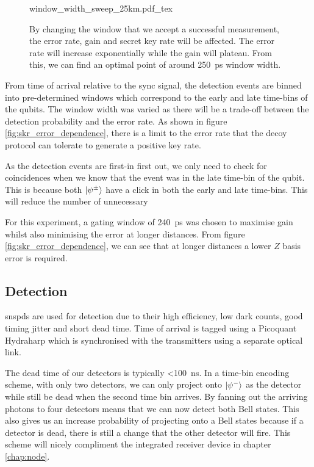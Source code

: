 \begin{figure}[tbp]
	\centering
	\tiny
	\def\svgwidth{\textwidth} 
	{window_width_sweep_25km.pdf_tex}
	\caption[Qubit window width sweep]{By changing the window that we accept a successful measurement, the error rate, gain and secret key rate will be affected. The error rate will increase exponentially while the gain will plateau. From this, we can find an optimal point of around \SI{250}{\ps} window width.}
	\label{fig:window_sweep}
\end{figure}

From time of arrival relative to the sync signal, the detection events are binned into pre-determined windows which correspond to the early and late time-bins of the qubits. The window width was varied as there will be a trade-off between the detection probability and the error rate. As shown in figure \ref{fig:skr_error_dependence}, there is a limit to the error rate that the decoy protocol can tolerate to generate a positive key rate.

As the detection events are first-in first out, we only need to check for coincidences when we know that the event was in the late time-bin of the qubit. This is because both $\ket{\psi^\pm}$ have a click in both the early and late time-bins. This will reduce the number of unnecessary 

For this experiment, a gating window of \SI{240}{\ps} was chosen to maximise gain whilst also minimising the error at longer distances. From figure \ref{fig:skr_error_dependence}, we can see that at longer distances a lower $Z$ basis error is required.

\subsection{Detection}

\Acsp{snspd} are used for detection due to their high efficiency, low dark counts, good timing jitter and short dead time. Time of arrival is tagged using a Picoquant Hydraharp which is synchronised with the transmitters using a separate optical link.

The dead time of our detectors is typically \SI{<100}{ns}. In a time-bin encoding scheme, with only two detectors, we can only project onto $\ket{\psi^{-}}$ as the detector while still be dead when the second time bin arrives. By fanning out the arriving photons to four detectors means that we can now detect both Bell states. This also gives us an increase probability of projecting onto a Bell states because if a detector is dead, there is still a change that the other detector will fire. This scheme will nicely compliment the integrated receiver device in chapter \ref{chap:node}.

